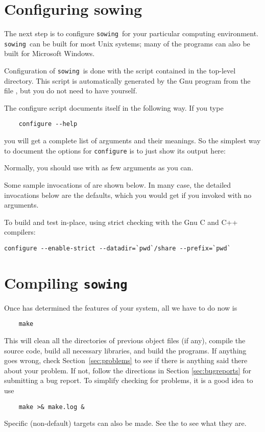 \documentclass[11pt,twoside]{article}
\newcommand{\sowing}{{\tt sowing}}
\begin{document}
\section{Configuring \texorpdfstring{sowing}{\texttt{sowing}}}
\label{sec:configuring}

The next step is to configure \sowing\ for your particular computing
environment.  \sowing\ can be built for most Unix systems; many of the
programs can also be built for Microsoft Windows.

Configuration of \sowing\ is done with the  script contained in
the top-level directory.  This script is automatically generated by the Gnu
 program from the file , but you do not need
to have  yourself.

The configure script documents itself in the following way.  If you type
\begin{verbatim}
    configure --help
\end{verbatim}
you will get a complete list of arguments and their meanings.  So the
simplest way to document the options for {\tt configure} is to just show
its output here:
\bigskip


Normally, you should use  with as few arguments as you can.

Some sample invocations of  are shown below.  In many case,
the detailed invocations below are the defaults, which you would get if you
invoked  with no arguments.

To build and test in-place, using strict checking with the Gnu C and C++
compilers: 
\begin{verbatim}
configure --enable-strict --datadir=`pwd`/share --prefix=`pwd`
\end{verbatim}

\section{Compiling \texorpdfstring{\sowing}{sowing}}
\label{sec:compiling}

Once  has determined the features of your system, all we have
to do now is 
\begin{verbatim}
    make
\end{verbatim}
This will clean all the directories of previous object files (if any), compile
the source code, build all necessary
libraries, and build the programs.  If anything goes wrong, check
Section~\ref{sec:problems} to see if there is anything said there about your
problem.  If not, follow the directions in Section \ref{sec:bugreports} for
submitting a bug report.  To simplify checking for problems, it is a good idea
to use 
\begin{verbatim}
    make >& make.log &
\end{verbatim}
Specific (non-default) targets can also be made.  See the  to
see what they are.
\end{document}

